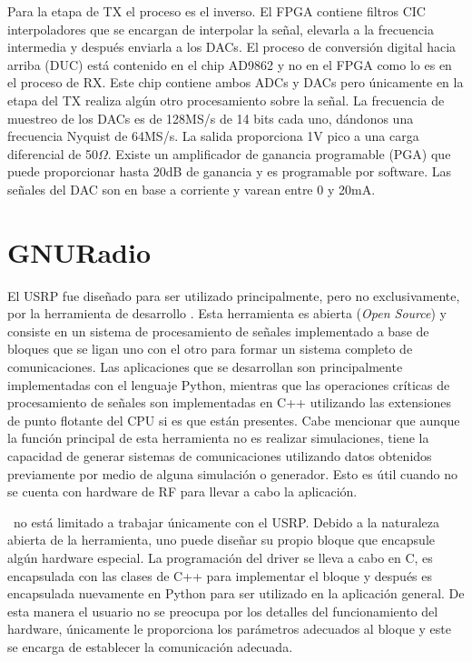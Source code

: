 Para la etapa de TX el proceso es el inverso. El FPGA contiene filtros CIC interpoladores que se
encargan de interpolar la se\~nal, elevarla a la frecuencia intermedia y despu\'es
enviarla a los DACs. El proceso de conversi\'on digital hacia arriba (DUC)
est\'a contenido en el chip AD9862 y no en el FPGA como lo es en el proceso de
RX. Este chip contiene ambos ADCs y DACs pero \'unicamente en la etapa del TX
realiza alg\'un otro procesamiento sobre la se\~nal. La frecuencia de muestreo
de los DACs es de 128MS/s de 14 bits cada uno, d\'andonos una frecuencia Nyquist
de 64MS/s. La salida proporciona 1V pico a una carga diferencial de 50$\Omega$.
Existe un amplificador de ganancia programable (PGA) que puede proporcionar
hasta 20dB de ganancia y es programable por software. Las se\~nales del DAC son
en base a corriente y varean entre 0 y 20mA.


\section{GNURadio}
\label{sec:gnuradio}

El USRP fue dise\~nado para ser utilizado principalmente, pero no
exclusivamente, por la herramienta de desarrollo \gnuradio. Esta
herramienta es abierta (\emph{Open Source}) y consiste en un sistema de
procesamiento de se\~nales implementado a base de bloques que se ligan uno con
el otro para formar un sistema completo de comunicaciones. Las aplicaciones que
se desarrollan son principalmente implementadas con el lenguaje Python, mientras
que las operaciones cr\'iticas de procesamiento de se\~nales son implementadas
en C++ utilizando las extensiones de punto flotante del CPU si es que est\'an
presentes. Cabe mencionar que aunque la funci\'on principal de esta herramienta
no es realizar simulaciones, tiene la capacidad de generar sistemas de
comunicaciones utilizando datos obtenidos previamente por medio de alguna
simulaci\'on o generador. Esto es \'util cuando no se cuenta con hardware de RF
para llevar a cabo la aplicaci\'on.

\gnuradio\ no est\'a limitado a trabajar \'unicamente con el USRP. Debido a
la naturaleza abierta de la herramienta, uno puede dise\~nar su propio bloque
que encapsule alg\'un hardware especial. La programaci\'on del driver se lleva a
cabo en C, es encapsulada con las clases de C++ para implementar el bloque y
despu\'es es encapsulada nuevamente en Python para ser utilizado en la
aplicaci\'on general. De esta manera el usuario no se preocupa por los detalles
del funcionamiento del hardware, \'unicamente le proporciona los par\'ametros
adecuados al bloque y este se encarga de establecer la comunicaci\'on adecuada.

